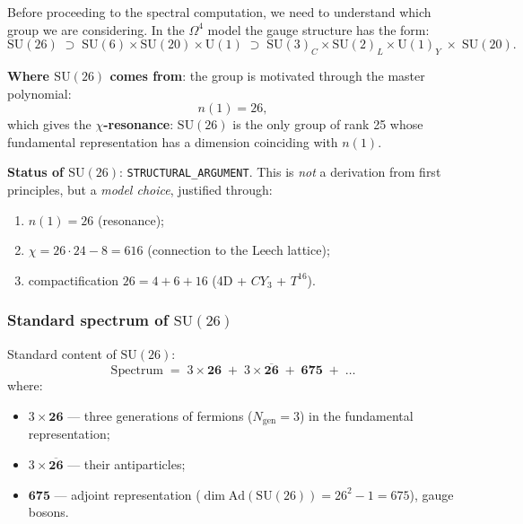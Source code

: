 \documentclass[11pt,a4paper]{article}
\newcommand{\SU}{\ensuremath{\mathrm{SU}}}
\newcommand{\Ad}{\ensuremath{\mathrm{Ad}}}
\newcommand{\CY}{\ensuremath{CY_3}}
\newcommand{\Om}{\ensuremath{\Omega^4}}
\newcommand{\Ngen}{\ensuremath{N_{\text{gen}}}}
\theoremstyle{definition}
\begin{document}
Before proceeding to the spectral computation, we need to understand which
group we are considering. In the $\Om$ model the gauge structure
has the form:
\begin{equation}
    \SU(26) \;\supset\; \SU(6) \times \SU(20) \times \mathrm{U}(1)
    \;\supset\; \SU(3)_C \times \SU(2)_L \times \mathrm{U}(1)_Y
    \;\times\; \SU(20).
    \label{eq:su26-chain}
\end{equation}

\medskip\noindent
\textbf{Where $\SU(26)$ comes from}: the group is motivated through the
master polynomial:
\begin{equation}
    n(1) = 26,
\end{equation}
which gives the \textbf{$\chi$-resonance}: $\SU(26)$ is the only
group of rank 25 whose fundamental representation has
a dimension coinciding with $n(1)$.

\medskip\noindent
\textbf{Status of $\SU(26)$}: \texttt{STRUCTURAL\_ARGUMENT}.
This is \emph{not} a derivation from first principles, but a \emph{model choice},
justified through:
\begin{enumerate}
    \item $n(1) = 26$ (resonance);
    \item $\chi = 26 \cdot 24 - 8 = 616$ (connection to the Leech lattice);
    \item compactification $26 = 4 + 6 + 16$ (4D + $\CY$ + $T^{16}$).
\end{enumerate}

\subsubsection{Standard spectrum of \texorpdfstring{$\SU(26)$}{(26)}}

Standard content of $\SU(26)$:
\begin{equation}
    \text{Spectrum} \;=\; 3 \times \mathbf{26}
    \;+\; 3 \times \overline{\mathbf{26}}
    \;+\; \mathbf{675} \;+\; \ldots
    \label{eq:su26-spectrum}
\end{equation}
where:
\begin{itemize}
    \item $3 \times \mathbf{26}$ --- three generations of fermions
          ($\Ngen = 3$) in the fundamental representation;
    \item $3 \times \overline{\mathbf{26}}$ --- their antiparticles;
    \item $\mathbf{675}$ --- adjoint representation
          ($\dim \Ad(\SU(26)) = 26^2 - 1 = 675$), gauge
          bosons.
\end{itemize}
\end{document}

